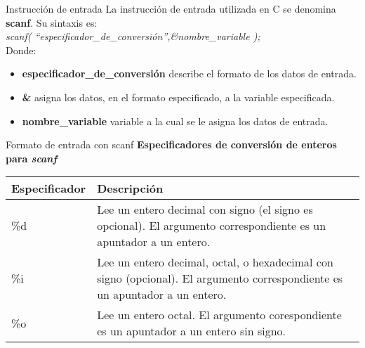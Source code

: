 \begin{frame}[t]{Instrucción de entrada}
La instrucción de entrada utilizada en C se denomina \textbf{scanf}. Su sintaxis es:\\
\textit{scanf( ``especificador\_de\_conversión'',\&nombre\_variable );}\\
Donde:
\begin{itemize}
	\item \textbf{especificador\_de\_conversión} describe el formato de los datos de entrada.
	\item \textbf{\&} asigna los datos, en el formato especificado, a la variable especificada.
	\item \textbf{nombre\_variable} variable a la cual se le asigna los datos de entrada.
\end{itemize}
\end{frame}

\begin{frame}[t]{Formato de entrada con scanf}
\textbf{Especificadores de conversi\'on de enteros para \textit{scanf}}
\small
\begin{center}
\begin{tabular}{lp{6cm}}
	\toprule
	\textbf{Especificador} & \textbf{Descripci\'on}\\
	\midrule
	\%d & Lee un entero decimal con signo (el signo es opcional). El argumento correspondiente es un apuntador a un entero. \\
	\%i & Lee un entero decimal, octal, o hexadecimal con signo (opcional). El argumento correspondiente es un apuntador a un entero.\\
	\%o & Lee un entero octal. El argumento corespondiente es un apuntador a un entero sin signo.\\
	\bottomrule
\end{tabular}
\end{center}
\end{frame}

